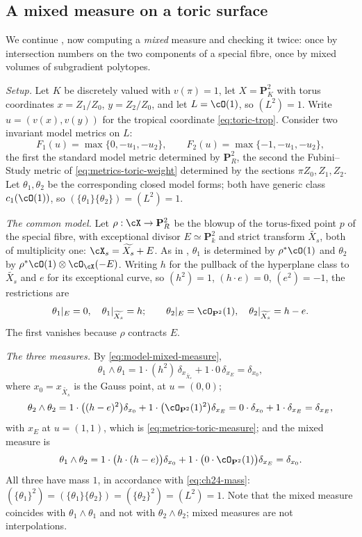 \subsection{A mixed measure on a toric surface}
\label{sec:ch24-ex-toric}

\begin{example}
\label{ex:ch24-toric-surface-mixed}
We continue , now computing a
\emph{mixed} measure and checking it twice: once by intersection numbers on
the two components of a special fibre, once by mixed volumes of subgradient
polytopes.

\emph{Setup.}  Let $K$ be discretely valued with $v(\pi)=1$, let
$X=\mathbf P^2_K$ with torus coordinates $x=Z_1/Z_0$, $y=Z_2/Z_0$, and
let $L=\cO(1)$, so $(L^2)=1$.  Write $u=(v(x),v(y))$ for the
tropical coordinate \eqref{eq:toric-trop}.  Consider two invariant model
metrics on $L$:
\[
 F_1(u)=\max\{0,-u_1,-u_2\},
 \qquad
 F_2(u)=\max\{-1,-u_1,-u_2\},
\]
the first the standard model metric determined by $\mathbf P^2_R$, the
second the Fubini--Study metric of \eqref{eq:metrics-toric-weight}
determined by the sections $\pi Z_0,Z_1,Z_2$.  Let $\theta_1,\theta_2$
be the corresponding closed model forms; both have generic class
$c_1(\cO(1))$, so $(\{\theta_1\}\{\theta_2\})=(L^2)=1$.

\emph{The common model.}  Let $\rho:\cX\to\mathbf P^2_R$ be the blowup of
the torus-fixed point $p$ of the special fibre, with exceptional divisor
$E\simeq\mathbf P^2_k$ and strict transform $\widetilde{X_s}$, both of
multiplicity one:
$\cX_s=\widetilde{X_s}+E$.  As in
, $\theta_1$ is determined by
$\rho^*\cO(1)$ and $\theta_2$ by
$\rho^*\cO(1)\otimes\cO_{\cX}(-E)$.  Writing $h$ for the pullback of the
hyperplane class to $\widetilde{X_s}$ and $e$ for its exceptional curve,
so $(h^2)=1$, $(h\cdot e)=0$, $(e^2)=-1$, the restrictions are
\[
 \theta_1|_{E}=0,\quad \theta_1|_{\widetilde{X_s}}=h;
 \qquad
 \theta_2|_{E}=\cO_{\mathbf P^2}(1),\quad
 \theta_2|_{\widetilde{X_s}}=h-e .
\]
The first vanishes because $\rho$ contracts $E$.

\emph{The three measures.}  By \eqref{eq:model-mixed-measure},
\[
 \theta_1\wedge\theta_1
 =1\cdot(h^2)\,\delta_{x_{\widetilde{X_s}}}+1\cdot0\,\delta_{x_E}
 =\delta_{x_0},
\]
where $x_0=x_{\widetilde{X_s}}$ is the Gauss point, at $u=(0,0)$;
\[
 \theta_2\wedge\theta_2
 =1\cdot\bigl((h-e)^2\bigr)\delta_{x_0}
  +1\cdot\bigl(\cO_{\mathbf P^2}(1)^2\bigr)\delta_{x_E}
 =0\cdot\delta_{x_0}+1\cdot\delta_{x_E}
 =\delta_{x_E},
\]
with $x_E$ at $u=(1,1)$, which is
\eqref{eq:metrics-toric-measure}; and the mixed measure is
\begin{equation}
\label{eq:ch24-toric-mixed}
 \theta_1\wedge\theta_2
 =1\cdot\bigl(h\cdot(h-e)\bigr)\delta_{x_0}
  +1\cdot\bigl(0\cdot\cO_{\mathbf P^2}(1)\bigr)\delta_{x_E}
 =\delta_{x_0}.
\end{equation}
All three have mass $1$, in accordance with \eqref{eq:ch24-mass}:
$(\{\theta_1\}^2)=(\{\theta_1\}\{\theta_2\})=(\{\theta_2\}^2)=(L^2)=1$.
Note that the mixed measure coincides with $\theta_1\wedge\theta_1$ and
not with $\theta_2\wedge\theta_2$; mixed measures are not interpolations.


\end{example}
